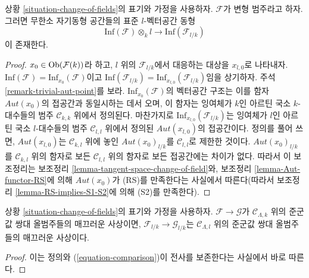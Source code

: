 \begin{lemma}
\label{lemma-inf-aut-change-of-field}
상황 \ref{situation-change-of-fields}의 표기와 가정을 사용하자.
$\mathcal{F}$가 변형 범주라고 하자. 그러면 무한소 자기동형 공간들의
표준 $l$-벡터공간 동형
$$
\text{Inf}(\mathcal{F}) \otimes_k l
\longrightarrow
\text{Inf}(\mathcal{F}_{l/k})
$$
이 존재한다.
\end{lemma}

\begin{proof}
$x_0 \in \mathop{\mathrm{Ob}}\nolimits(\mathcal{F}(k))$라 하고, $l$ 위의 $\mathcal{F}_{l/k}$에서
대응하는 대상을 $x_{l, 0}$로 나타내자.
$\text{Inf}(\mathcal{F}) = \text{Inf}_{x_0}(\mathcal{F})$이고
$\text{Inf}(\mathcal{F}_{l/k}) = \text{Inf}_{x_{l, 0}}(\mathcal{F}_{l/k})$임을
상기하자. 주석 \ref{remark-trivial-aut-point}를 보라.
$\text{Inf}_{x_0}(\mathcal{F})$의 벡터공간 구조는 이를 함자
$\mathit{Aut}(x_0)$의 접공간과 동일시하는 데서 오며, 이 함자는 잉여체가
$k$인 아르틴 국소 $k$-대수들의 범주 $\mathcal{C}_{k, k}$ 위에서 정의된다.
마찬가지로 $\text{Inf}_{x_{l, 0}}(\mathcal{F}_{l/k})$는 잉여체가 $l$인
아르틴 국소 $l$-대수들의 범주 $\mathcal{C}_{l, l}$ 위에서 정의된
$\mathit{Aut}(x_{l, 0})$의 접공간이다. 정의를 풀어 쓰면,
$\mathit{Aut}(x_{l, 0})$는 $\mathcal{C}_{k, l}$ 위에 놓인
$\mathit{Aut}(x_0)_{l/k}$를 $\mathcal{C}_{l, l}$로 제한한 것이다.
$\mathit{Aut}(x_0)_{l/k}$를 $\mathcal{C}_{k, l}$ 위의 함자로 보든
$\mathcal{C}_{l, l}$ 위의 함자로 보든 접공간에는 차이가 없다. 따라서
이 보조정리는 보조정리 \ref{lemma-tangent-space-change-of-field}와,
보조정리 \ref{lemma-Aut-functor-RS}에 의해 $\mathit{Aut}(x_0)$가
(RS)를 만족한다는 사실에서 따른다(따라서 보조정리
\ref{lemma-RS-implies-S1-S2}에 의해 (S2)를 만족한다).
\end{proof}

\begin{lemma}
\label{lemma-change-of-fields-smooth}
상황 \ref{situation-change-of-fields}의 표기와 가정을 사용하자.
$\mathcal{F} \to \mathcal{G}$가 $\mathcal{C}_{\Lambda, k}$ 위의
준군값 쌍대 올범주들의 매끄러운 사상이면,
$\mathcal{F}_{l/k} \to \mathcal{G}_{l/k}$는 $\mathcal{C}_{\Lambda, l}$ 위의
준군값 쌍대 올범주들의 매끄러운 사상이다.
\end{lemma}

\begin{proof}
이는 정의와 (\ref{equation-comparison})이 전사를 보존한다는 사실에서
바로 따른다.
\end{proof}

